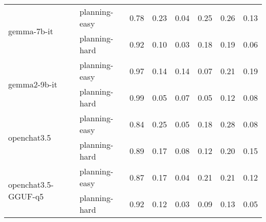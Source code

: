 \begin{tabular}{llrrrrrr}
\cline{1-8}
\multirow[c]{2}{*}{gemma-7b-it} & planning-easy & 0.78 & 0.23 & 0.04 & 0.25 & 0.26 & 0.13 \\
 & planning-hard & 0.92 & 0.10 & 0.03 & 0.18 & 0.19 & 0.06 \\
\cline{1-8}
\multirow[c]{2}{*}{gemma2-9b-it} & planning-easy & 0.97 & 0.14 & 0.14 & 0.07 & 0.21 & 0.19 \\
 & planning-hard & 0.99 & 0.05 & 0.07 & 0.05 & 0.12 & 0.08 \\
\cline{1-8}
\multirow[c]{2}{*}{openchat3.5} & planning-easy & 0.84 & 0.25 & 0.05 & 0.18 & 0.28 & 0.08 \\
 & planning-hard & 0.89 & 0.17 & 0.08 & 0.12 & 0.20 & 0.15 \\
\cline{1-8}
\multirow[c]{2}{*}{openchat3.5-GGUF-q5} & planning-easy & 0.87 & 0.17 & 0.04 & 0.21 & 0.21 & 0.12 \\
 & planning-hard & 0.92 & 0.12 & 0.03 & 0.09 & 0.13 & 0.05 \\
\cline{1-8}
\hline
\end{tabular}
